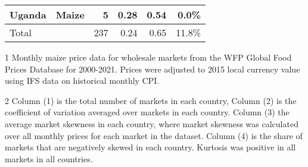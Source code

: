 \begin{table}[ht!]
\begin{threeparttable}[t]
\begin{tabular}{|ll|rrrr|}
  Uganda & Maize &   5 & 0.28 & 0.54 & 0.0\% \\ 
  \hline
  Total &  & 237 & 0.24 & 0.65 & 11.8\% \\ 
    \hline
\end{tabular}
\begin{tablenotes}
\item [1] \footnotesize Monthly maize price data for wholesale markets from the WFP Global Food Prices Database for 2000-2021. Prices were adjusted to 2015 local currency value using IFS data on historical monthly CPI.
\item[2] Column (1) is the total number of markets in each country, Column (2) is the coefficient of variation averaged over markets in each country. Column (3) the average market skewness in each country, where market skewness was calculated over all monthly prices for each market in the dataset. Column (4) is the share of markets that are negatively skewed in each country. Kurtosis was positive in all markets in all countries. 
\end{tablenotes}
\end{threeparttable}
\end{table}

